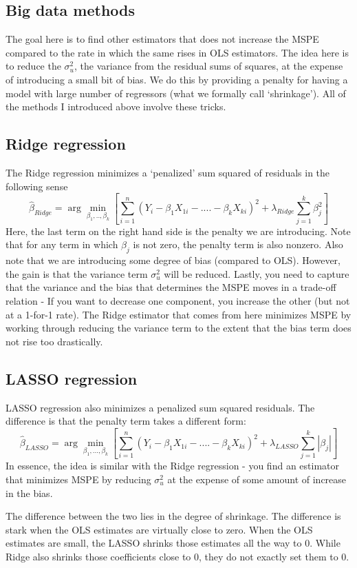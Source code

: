 \documentclass[12pt]{article}
\theoremstyle{definition}
\theoremstyle{property}
\theoremstyle{assumption}
\theoremstyle{example}
\theoremstyle{comment}
\begin{document}
\subsection{Big data methods}
The goal here is to find other estimators that does not increase the MSPE compared to the rate in which the same rises in OLS estimators. The idea here is to reduce the $\sigma_u^2$, the variance from the residual sums of squares, at the expense of introducing a small bit of bias. We do this by providing a penalty for having a model with large number of regressors (what we formally call `shrinkage'). All of the methods I introduced above involve these tricks. 
\subsection{Ridge regression}
The Ridge regression minimizes a `penalized' sum squared of residuals in the following sense
\[
\hat{\beta}_{Ridge}=\arg\min_{\beta_1,..,\beta_k}\left[ \sum_{i=1}^n(Y_i - \beta_1X_{1i}-....-\beta_kX_{ki})^2 + \lambda_{Ridge}\sum_{j=1}^k\beta_j^2\right]
\]
Here, the last term on the right hand side is the penalty we are introducing. Note that for any term in which $\beta_j$ is not zero, the penalty term is also nonzero. Also note that we are introducing some degree of bias (compared to OLS). However, the gain is that the variance term $\sigma_u^2$ will be reduced. Lastly, you need to capture that the variance and the bias that determines the MSPE moves in a trade-off relation - If you want to decrease one component, you increase the other (but not at a 1-for-1 rate). The Ridge estimator that comes from here minimizes MSPE by working through reducing the variance term to the extent that the bias term does not rise too drastically. 

\subsection{LASSO regression}
LASSO regression also minimizes a penalized sum squared residuals. The difference is that the penalty term takes a different form: 
\[
\hat{\beta}_{LASSO}=\arg\min_{\beta_1,...,\beta_k}\left[ \sum_{i=1}^n(Y_i - \beta_1X_{1i}-....-\beta_kX_{ki})^2 + \lambda_{LASSO}\sum_{j=1}^k |\beta_j|\right]
\]
In essence, the idea is similar with the Ridge regression - you find an estimator that minimizes MSPE by reducing $\sigma_u^2$ at the expense of some amount of increase in the bias. 
\par\medskip
The difference between the two lies in the degree of shrinkage. The difference is stark when the OLS estimates are virtually close to zero. When the OLS estimates are small, the LASSO shrinks those estimates all the way to 0. While Ridge also shrinks those coefficients close to 0, they do not exactly set them to 0. 
\end{document}
